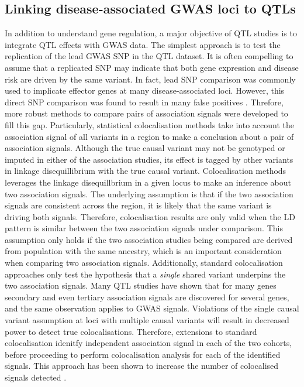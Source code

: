 \subsection{Linking disease-associated GWAS loci to QTLs}
In addition to understand gene regulation, a major objective of QTL studies is to integrate QTL effects with GWAS data. The simplest approach is to test the replication of the lead GWAS SNP in the QTL dataset. It is often compelling to assume that a replicated SNP may indicate that both gene expression and disease risk are driven by the same variant. In fact, lead SNP comparison was commonly used to implicate effector genes at many disease-associated loci. However, this direct SNP comparison was found to result in many false positives \cite{Liu2019-fv}. Threfore, more robust methods to compare pairs of association signals were developed to fill this gap. Particularly, statistical colocalisation methods take into account the association signal of all variants in a region to make a conclusion about a pair of association signals. Although the true causal variant may not be genotyped or imputed in either of the association studies, its effect is tagged by other variants in linkage disequillibrium with the true causal variant. Colocalisation methods leverages the linkage disequillbrium in a given locus to make an inference about two association signals. The underlying assumption is that if the two association signals are consistent across the region, it is likely that the same variant is driving both signals. Therefore, colocalisation results are only valid when the LD pattern is similar between the two association signals under comparison. This assumption only holds if the two association studies being compared are derived from population with the same ancestry, which is an important consideration when comparing two association signals. Additionally, standard colocalisation approaches only test the hypothesis that a \textit{single} shared variant underpins the two association signals. Many QTL studies have shown that for many genes secondary and even tertiary association signals are discovered for several genes, and the same observation applies to GWAS signals. Violations of the single causal variant assumption at loci with multiple causal variants will result in decreased power to detect true colocalisations. Therefore, extensions to standard colocalisation idenitfy independent association signal in each of the two cohorts, before proceeding to perform colocalisation analysis for each of the identified signals. This approach has been shown to increase the number of colocalised signals detected \cite{Wallace2021-rv}.\\  


